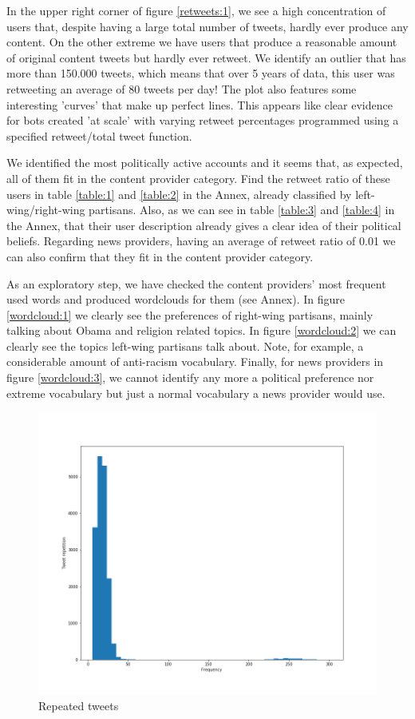 \documentclass[12pt, authoryear]{elsarticle}
\begin{document}
In the upper right corner of figure \ref{retweets:1}, we see a high concentration of users that, despite having a large total number of tweets, hardly ever produce any content. On the other extreme we have users that produce a reasonable amount of original content tweets but hardly ever retweet. We identify an outlier that has more than 150.000 tweets, which means that over 5 years of data, this user was retweeting an average of 80 tweets per day! The plot also features some interesting 'curves' that make up perfect lines. This appears like clear evidence for bots created 'at scale' with varying retweet percentages programmed using a specified retweet/total tweet function.

We identified the most politically active accounts and it seems that, as expected, all of them fit in the content provider category. Find the retweet ratio of these users in table \ref{table:1} and \ref{table:2} in the Annex, already classified by left-wing/right-wing partisans. Also, as we can see in table \ref{table:3} and \ref{table:4} in the Annex, that their user description already gives a clear idea of their political beliefs. Regarding news providers, having an average of retweet ratio of 0.01 we can also confirm that they fit in the content provider category.

As an exploratory step, we have checked the content providers' most frequent used words and produced wordclouds for them (see Annex). In figure \ref{wordcloud:1} we clearly see the preferences of right-wing partisans, mainly talking about Obama and religion related topics. In figure \ref{wordcloud:2} we can clearly see the topics left-wing partisans talk about.  Note, for example, a considerable amount of anti-racism vocabulary. Finally, for news providers in figure \ref{wordcloud:3}, we cannot identify any more a political preference nor extreme vocabulary but just a normal vocabulary a news provider would use.

\begin{figure}[t]
\includegraphics[width=\textwidth]{tweet_rep}
\centering
\caption{Repeated tweets}
\label{retweets:2}
\end{figure}
\end{document}

